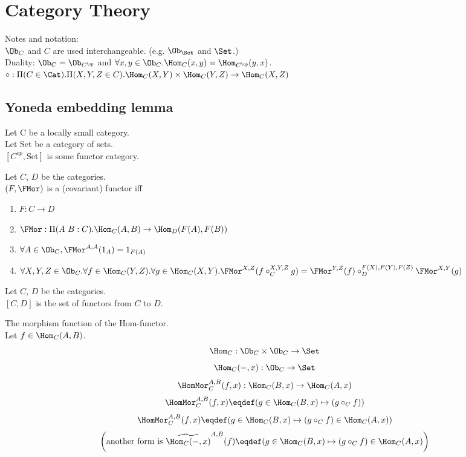 \documentclass[10pt,a4paper]{article}
\begin{document}
\section{Category Theory}
Notes and notation:\\
$\Ob_C$ and $C$ are used interchangeable. (e.g. $\Ob_\Set$ and $\Set$.)\\
Duality: $\Ob_C = \Ob_{C^\op}$ and 
 $\forall x,y \in \Ob_C. \Hom_C(x,y) = \Hom_{C^\op}(y,x)$.\\
$\circ : \Pi(C\in \Cat).\Pi(X,Y,Z\in C).\Hom_C(X,Y)\times\Hom_C(Y,Z)\to\Hom_C(X,Z)$

\subsection{Yoneda embedding lemma}
Let C be a locally small category.\\
Let Set be a category of sets.\\
$[C^{op},\textrm{Set}]$ is some functor category.\\

\begin{definition}
Let $C$, $D$ be the categories.\\
 $(F, \FMor)$ is a (covariant) functor iff\\
\begin{enumerate}
\item $F:C \to D$
\item $\FMor:\Pi(A\ B:C).\Hom_C(A,B) \to \Hom_D(F(A), F(B))$
\item $\forall A\in \Ob_C, \FMor^{A,A}(1_A)=1_{F(A)}$
\item $\forall X,Y,Z \in \Ob_C.\forall f\in\Hom_C(Y,Z).\forall g\in\Hom_C(X,Y). \FMor^{X,Z}(f\circ_C^{X,Y,Z} g)=\FMor^{Y,Z}(f)\circ_D^{F(X),F(Y),F(Z)} \FMor^{X,Y}(g)$
\end{enumerate}

\end{definition}

\begin{definition}
Let $C$, $D$ be the categories.\\
$[C,D]$ is the set of functors from $C$ to $D$.\\
\end{definition}

\begin{definition} The morphism function of the Hom-functor.\\
Let $f\in\Hom_{C}(A,B)$.
$$\Hom_C: \Ob_C \times \Ob_C \to \Set$$
$$\Hom_C(-,x): \Ob_C \to \Set$$
$$\HomMor^{A,B}_C(f,x) : \Hom_C(B,x) \to \Hom_C(A,x)$$
$$\HomMor^{A,B}_C(f,x) \eqdef (g \in\Hom_C(B,x) \mapsto (g \circ_C f))$$
$$\HomMor^{A,B}_C(f,x) \eqdef (g \in\Hom_C(B,x) \mapsto (g \circ_C f) \in\Hom_C(A,x))$$
$$\left(\textrm{another form is }\widetilde{\Hom_C(-,x)}^{A,B}(f) \eqdef (g \in\Hom_C(B,x) \mapsto (g \circ_C f) \in\Hom_C(A,x)\right)$$
\end{definition}
\end{document}
